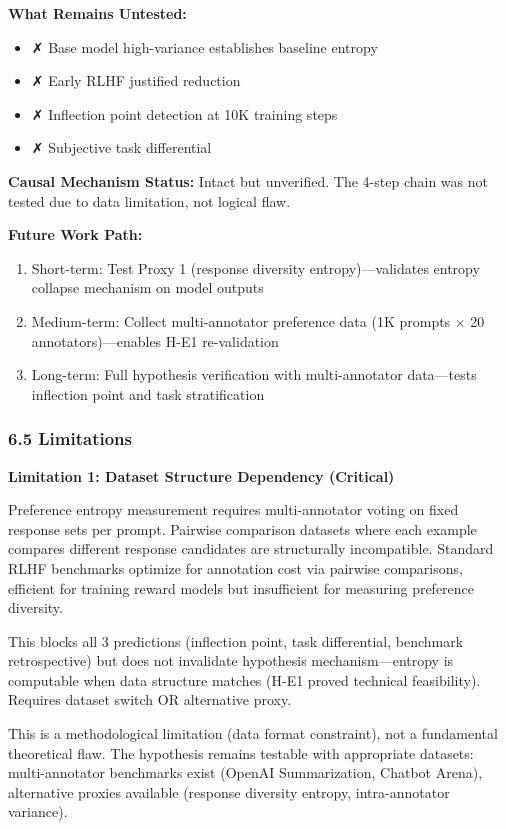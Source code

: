 \textbf{What Remains Untested:}
\begin{itemize}
\item ✗ Base model high-variance establishes baseline entropy
\item ✗ Early RLHF justified reduction
\item ✗ Inflection point detection at 10K training steps
\item ✗ Subjective task differential
\end{itemize}

\textbf{Causal Mechanism Status:} Intact but unverified. The 4-step chain was not tested due to data limitation, not logical flaw.

\textbf{Future Work Path:}
\begin{enumerate}
\item Short-term: Test Proxy 1 (response diversity entropy)---validates entropy collapse mechanism on model outputs
\item Medium-term: Collect multi-annotator preference data (1K prompts $\times$ 20 annotators)---enables H-E1 re-validation
\item Long-term: Full hypothesis verification with multi-annotator data---tests inflection point and task stratification
\end{enumerate}

\subsubsection{6.5 Limitations}

\textbf{Limitation 1: Dataset Structure Dependency (Critical)}

Preference entropy measurement requires multi-annotator voting on fixed response sets per prompt. Pairwise comparison datasets where each example compares different response candidates are structurally incompatible. Standard RLHF benchmarks optimize for annotation cost via pairwise comparisons, efficient for training reward models but insufficient for measuring preference diversity.

This blocks all 3 predictions (inflection point, task differential, benchmark retrospective) but does not invalidate hypothesis mechanism---entropy is computable when data structure matches (H-E1 proved technical feasibility). Requires dataset switch OR alternative proxy.

This is a methodological limitation (data format constraint), not a fundamental theoretical flaw. The hypothesis remains testable with appropriate datasets: multi-annotator benchmarks exist (OpenAI Summarization, Chatbot Arena), alternative proxies available (response diversity entropy, intra-annotator variance).

